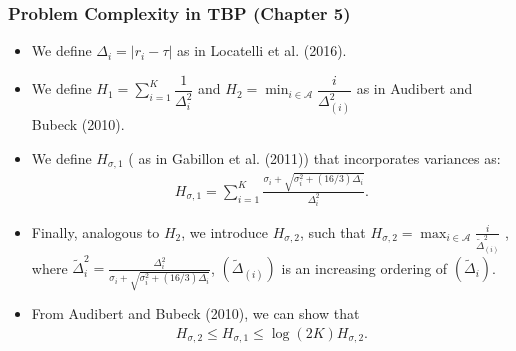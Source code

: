 \begin{frame}
\frametitle{Problem Complexity in TBP ({Chapter 5})}
\begin{itemize}
\item<1-> We define $\Delta_i= |r_i - \tau |$ as in Locatelli et al. (2016).
\item<2-> We define $H_{1} = \sum_{i=1}^{K}\dfrac{1}{\Delta_{i}^{2}}$ and $
H_{2} =\min_{i\in \mathcal{A}}\dfrac{i}{{\Delta_{(i)}^{2}}}$ as in Audibert and Bubeck (2010).
\item<3-> We define $H_{\sigma , 1}$ ( as in {Gabillon et al. (2011)}) that incorporates variances as:
\begin{align*}
 H_{\sigma,1}=\sum_{i=1}^{K}\frac{\sigma_{i}+\sqrt{\sigma_{i}^{2}+(16/3)\Delta_{i}}}{\Delta_{i}^{2}}.
\end{align*}
\item<4-> Finally, analogous to $H_{2}$, we introduce $H_{\sigma,2}$, such that $
H_{\sigma,2}=\max_{i\in \mathcal{A}} \frac{i}{\tilde{\Delta}_{(i)}^{2}}$ , where $\tilde{\Delta}_{i}^{2}=\frac{\Delta_{i}^{2}}{\sigma_{i}+\sqrt{\sigma_{i}^{2}+(16/3)\Delta_{i}}}$,  $(\tilde{\Delta}_{(i)})$ is an increasing ordering of $(\tilde{\Delta}_{i})$.
\item<5-> From {Audibert and Bubeck (2010)}, we can show that
\begin{align*}
H_{\sigma,2}\le H_{\sigma,1} \le \log(2K) H_{\sigma,2}.
\end{align*}



\end{itemize}
\end{frame}



